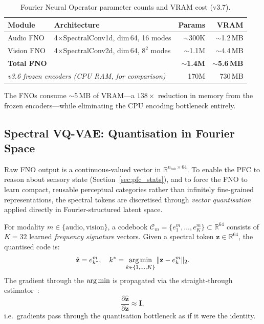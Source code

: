 \begin{table}[h]
\centering
\caption{Fourier Neural Operator parameter counts and VRAM cost (v3.7).}
\label{tab:fno_params}
\small
\begin{tabularx}{\columnwidth}{lXrr}
\toprule
\textbf{Module} & \textbf{Architecture} & \textbf{Params} & \textbf{VRAM} \\
\midrule
Audio FNO     & 4$\times$SpectralConv1d, dim\,64, 16 modes   & $\sim$300K & $\sim$1.2\,MB \\
Vision FNO    & 4$\times$SpectralConv2d, dim\,64, $8^2$ modes & $\sim$1.1M & $\sim$4.4\,MB \\
\rowcolor{gray!10}
\textbf{Total FNO} & & \textbf{$\sim$1.4M} & \textbf{$\sim$5.6\,MB} \\
\midrule
\multicolumn{2}{l}{\textit{v3.6 frozen encoders (CPU RAM, for comparison)}} & 170M & 730\,MB \\
\bottomrule
\end{tabularx}
\end{table}

The FNOs consume $\sim$5\,MB of VRAM---a $138\times$ reduction in memory from the
frozen encoders---while eliminating the CPU encoding bottleneck entirely.

\subsection{Spectral VQ-VAE: Quantisation in Fourier Space}
\label{sec:spectral_vqvae}

Raw FNO output is a continuous-valued vector in $\mathbb{R}^{n_{\mathrm{tok}} \times 64}$.
To enable the PFC to reason about sensory state (Section~\ref{sec:pfc_stats}), and to
force the FNO to learn compact, reusable perceptual categories rather than infinitely
fine-grained representations, the spectral tokens are discretised through
\emph{vector quantisation}~\cite{vqvae2017} applied directly in Fourier-structured
latent space.

\begin{definition}
For modality $m \in \{\mathrm{audio}, \mathrm{vision}\}$, a codebook
$\mathcal{C}_m = \{e_1^m, \ldots, e_K^m\} \subset \mathbb{R}^{64}$
consists of $K = 32$ learned \emph{frequency signature} vectors.
Given a spectral token $\mathbf{z} \in \mathbb{R}^{64}$, the quantised code is:
\begin{equation}
\hat{\mathbf{z}} = e_{k^*}^m, \quad
k^* = \operatorname*{arg\,min}_{k \in \{1,\ldots,K\}} \| \mathbf{z} - e_k^m \|_2.
\label{eq:vq_lookup}
\end{equation}
The gradient through the $\operatorname*{arg\,min}$ is propagated via the straight-through
estimator~\cite{vqvae2017}:
\begin{equation}
\frac{\partial \hat{\mathbf{z}}}{\partial \mathbf{z}} \approx \mathbf{I},
\label{eq:ste}
\end{equation}
i.e.\ gradients pass through the quantisation bottleneck as if it were the identity.
\end{definition}

